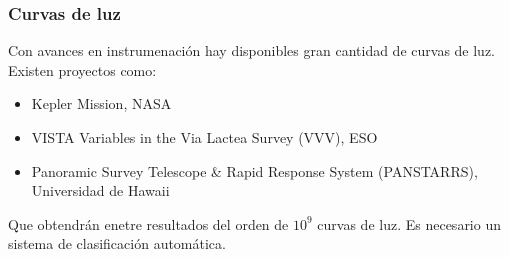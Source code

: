 \documentclass{beamer}
\begin{document}
\begin{frame}
\end{frame}

\begin{frame}
  \frametitle{Curvas de luz}
  Con avances en instrumenación hay disponibles gran cantidad de curvas de luz. Existen proyectos como:
  \begin{itemize}
  \item Kepler Mission, NASA
  \item VISTA Variables in the Via Lactea Survey (VVV), ESO
  \item Panoramic Survey Telescope \& Rapid Response System (PANSTARRS), Universidad de Hawaii
  \end{itemize}
  Que obtendrán enetre resultados del orden de $10^9$ curvas de luz. Es necesario un sistema de clasificación automática.
\end{frame}
\end{document}
